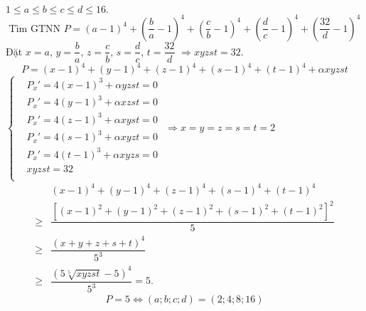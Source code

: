 \begin{bt}[IMO 1984]%
	$1 \leq a \leq b \leq c \leq d \leq 16.$\\ $$\text{Tìm GTNN } P=\left(a-1\right)^4+\left(\dfrac{b}{a}-1\right)^4+\left(\dfrac{c}{b}-1\right)^4+\left(\dfrac{d}{c}-1\right)^4+\left(\dfrac{32}{d}-1\right)^4$$
	\loigiai
	{
		Đặt $x=a$, $y=\dfrac{b}{a}$, $z=\dfrac{c}{b}$, $s=\dfrac{d}{c}$, $t=\dfrac{32}{d}$ $\Rightarrow xyzst =32.$\\
		$$P=\left(x-1\right)^4+\left(y-1\right)^4+\left(z-1\right)^4+\left(s-1\right)^4+\left(t-1\right)^4+ \alpha xyzst$$
		$\left\{\begin{aligned}
		&P_x ' = 4(x-1)^3+\alpha yzst=0\\
		&P_x ' = 4(y-1)^3+\alpha xzst=0\\
		&P_x ' = 4(z-1)^3+\alpha xyst=0\\
		&P_x ' = 4(s-1)^3+\alpha xyzt=0\\
		&P_x ' = 4(t-1)^3+\alpha xyzs=0\\
		&xyzst=32\\
		\end{aligned}\right.$ $\Rightarrow x = y =z =s = t = 2$
		\begin{align*}
		&\left(x-1\right)^4+\left(y-1\right)^4+\left(z-1\right)^4+\left(s-1\right)^4+\left(t-1\right)^4\\
		\geq &\dfrac{\left[\left(x-1\right)^2+\left(y-1\right)^2+\left(z-1\right)^2+\left(s-1\right)^2+\left(t-1\right)^2\right]^2}{5}\\
		\geq&\dfrac{\left(x+y+z+s+t\right)^4}{5^3}\\
		\geq & \dfrac{\left(5\sqrt[5]{xyzst}-5\right)^4}{5^3}=5. 
		\end{align*}
		$$P=5 \Leftrightarrow \left(a;b;c;d\right)=(2;4;8;16)$$
	}
\end{bt}
